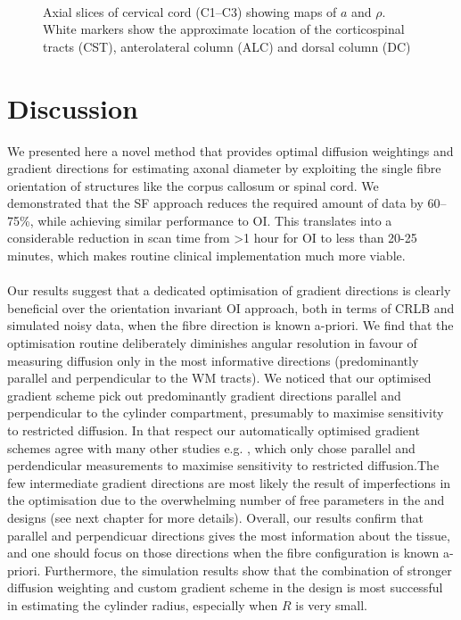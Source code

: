 \begin{figure}[ht]
	\centering
	\\	
	\caption{Axial slices of cervical cord (C1--C3) showing maps of $a$ and $\rho$. White markers show the approximate location of the corticospinal tracts (CST), anterolateral column (ALC) and dorsal column (DC)}
	\label{fig:chapter7 exp1 monkey data}
\end{figure}

\section{Discussion}
We presented here a novel method that provides optimal diffusion weightings and gradient directions for estimating axonal diameter by exploiting the single fibre orientation of structures like the corpus callosum or spinal cord. We demonstrated that the {\gls{SF}} approach reduces the required amount of data by 60--75\%, while achieving similar performance to {\gls{OI}}. This translates into a considerable reduction in scan time from >1 hour for {\gls{OI}} to less than 20-25 minutes, which makes routine clinical implementation much more viable.  

\paragraph{}
Our results suggest that a dedicated optimisation of gradient directions is clearly beneficial over the orientation invariant \gls{OI}{} approach, both in terms of CRLB and simulated noisy data, when the fibre direction is known a-priori. We find that the optimisation routine deliberately diminishes angular resolution in favour of measuring diffusion only in the most informative directions (predominantly parallel and perpendicular to the WM tracts). We noticed that our optimised gradient scheme pick out predominantly gradient directions parallel and perpendicular to the cylinder compartment, presumably to maximise sensitivity to restricted diffusion. In that respect our automatically optimised gradient schemes agree with many other studies e.g. \citep{Stanisz:1997,Avram:2008,Assaf:2008,Panagiotaki:2012}, which only chose parallel and perdendicular measurements to maximise sensitivity to restricted diffusion.The few intermediate gradient directions are most likely the result of imperfections in the optimisation due to the overwhelming number of free parameters in the \FD{} and \DO{} designs (see next chapter for more details). Overall, our results confirm that parallel and perpendicuar directions gives the most information about the tissue, and one should focus on those directions when the fibre configuration is known a-priori. Furthermore, the simulation results show that the combination of stronger diffusion weighting and custom gradient scheme in the \FD{} design is most successful in estimating the cylinder radius, especially when $R$ is very small.


